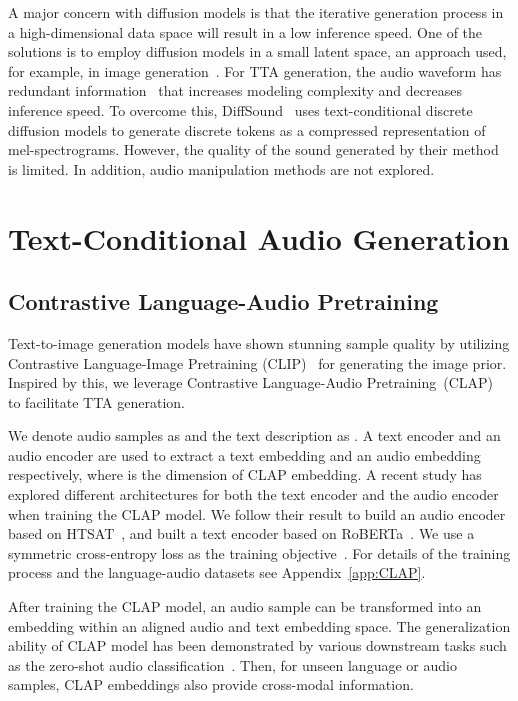 \documentclass{article}
\begin{document}
A major concern with diffusion models is that the iterative generation process in a high-dimensional data space will result in a low inference speed. One of the solutions is to employ diffusion models in a small latent space, an approach used, for example, in image generation~\cite{LSGM, D2C, rombach2022high}. For TTA generation, the audio waveform has redundant information~\cite{liu2022simple, liu2022learning} that increases modeling complexity and decreases inference speed. To overcome this, DiffSound~\cite{yang2022diffsound} uses text-conditional discrete diffusion models to generate discrete tokens as a compressed representation of mel-spectrograms. However, the quality of the sound generated by their method is limited. In addition, audio manipulation methods are not explored. 




\section{Text-Conditional Audio Generation}
\label{AudioLDM}





\subsection{Contrastive Language-Audio Pretraining}
\label{CLAP}
Text-to-image generation models have shown stunning sample quality by utilizing Contrastive Language-Image Pretraining (CLIP)~\cite{CLIP} for generating the image prior. Inspired by this, we leverage Contrastive Language-Audio Pretraining~(CLAP)~\cite{wu2022large} to facilitate TTA generation.   

We denote audio samples as  and the text description as . A text encoder  and an audio encoder  are used to extract a text embedding  and an audio embedding  respectively, where  is the dimension of CLAP embedding. A recent study \cite{wu2022large} has explored different architectures for both the text encoder and the audio encoder when training the CLAP model. We follow their result to build an audio encoder based on HTSAT~\cite{HTSAT}, and built a text encoder based on RoBERTa~\cite{RoBERTa}. We use a symmetric cross-entropy loss as the training objective~\cite{CLIP,wu2022large}. For details of the training process and the language-audio datasets see Appendix~\ref{app:CLAP}. 

After training the CLAP model, an audio sample  can be transformed into an embedding  within an aligned audio and text embedding space. The generalization ability of CLAP model has been demonstrated by various downstream tasks such as the zero-shot audio classification~\cite{wu2022large}. Then, for unseen language or audio samples, CLAP embeddings also provide cross-modal information.
\end{document}
